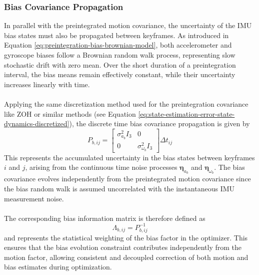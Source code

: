 \subsubsection{Bias Covariance Propagation}
In parallel with the preintegrated motion covariance, the uncertainty of the IMU bias states must also be propagated between keyframes. As introduced in Equation \ref{eq:preintegration-bias-brownian-model}, both accelerometer and gyroscope biases follow a Brownian random walk process, representing slow stochastic drift with zero mean. Over the short duration of a preintegration interval, the bias means remain effectively constant, while their uncertainty increases linearly with time.  
\\ \\
Applying the same discretization method used for the preintegration covariance like ZOH or similar methods (see Equation \ref{eq:state-estimation-error-state-dynamics-discretized}), the discrete time bias covariance propagation is given by
$$
    P_{b,ij} =
    \begin{bmatrix}
        \sigma_{a_b}^2 I_3 & 0 \\
        0 & \sigma_{\omega_b}^2 I_3
    \end{bmatrix}
    \Delta t_{ij}
$$
This represents the accumulated uncertainty in the bias states between keyframes $i$ and $j$, arising from the continuous time noise processes $\boldsymbol{\eta}_{a_b}$ and $\boldsymbol{\eta}_{\omega_b}$. The bias covariance evolves independently from the preintegrated motion covariance since the bias random walk is assumed uncorrelated with the instantaneous IMU measurement noise.  
\\ \\
The corresponding bias information matrix is therefore defined as
$$
    \Lambda_{b,ij} = P_{b,ij}^{-1}
$$
and represents the statistical weighting of the bias factor in the optimizer. This ensures that the bias evolution constraint contributes independently from the motion factor, allowing consistent and decoupled correction of both motion and bias estimates during optimization.



